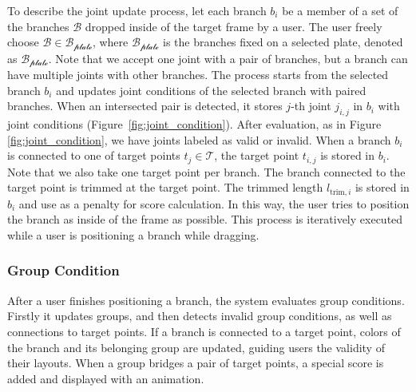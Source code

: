 To describe the joint update process, let each branch $b_i$ be a member of a set of the branches $\mathcal{B}$ dropped inside of the target frame by a user.
The user freely choose $\mathcal{B} \in \mathcal{B_\text{plate}}$, where $\mathcal{B_\text{plate}}$ is the branches fixed on a selected plate, denoted as $\mathcal{B_\text{plate}}$.
Note that we accept one joint with a pair of branches, but a branch can have multiple joints with other branches. 
The process starts from the selected branch $b_i$ and updates joint conditions of the selected branch with paired branches.
When an intersected pair is detected, it stores $j$-th joint $j_{i, j}$ in $b_i$ with joint conditions (Figure~\ref{fig:joint_condition}).
After evaluation, as in Figure \ref{fig:joint_condition},  we have joints labeled as valid or invalid.
When a branch $b_i$ is connected to one of target points $t_j \in \mathcal{T}$, the target point $t_{i, j}$ is stored in $b_i$.
Note that we also take one target point per branch.
The branch connected to the target point is trimmed at the target point.
The trimmed length $l_{\text{trim}, i}$ is stored in $b_i$ and use as a penalty for score calculation.
In this way, the user tries to position the branch as inside of the frame as possible. 
This process is iteratively executed while a user is positioning a branch while dragging.






\subsubsection{Group Condition}

After a user finishes positioning a branch, the system evaluates group conditions.
Firstly it updates groups, and then detects invalid group conditions, as well as connections to target points.
If a branch is connected to a target point, colors of the branch and its belonging group are updated, guiding users the validity of their layouts.
When a group bridges a pair of target points, a special score is added and displayed with an animation.

